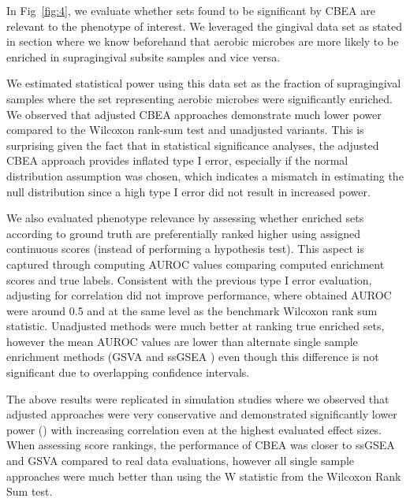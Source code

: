 \documentclass[10pt,letterpaper]{article}
\begin{document}
In Fig~\ref{fig:4}, we evaluate whether sets found to be significant by CBEA are relevant to the phenotype of interest. We leveraged the gingival data set as stated in  section where we know beforehand that aerobic microbes are more likely to be enriched in supragingival subsite samples and vice versa. 

We estimated statistical power using this data set as the fraction of supragingival samples where the set representing aerobic microbes were significantly enriched. We observed that adjusted CBEA approaches demonstrate much lower power compared to the Wilcoxon rank-sum test and unadjusted variants. This is surprising given the fact that in statistical significance analyses, the adjusted CBEA approach provides inflated type I error, especially if the normal distribution assumption was chosen, which indicates a mismatch in estimating the null distribution since a high type I error did not result in increased power. 

We also evaluated phenotype relevance by assessing whether enriched sets according to ground truth are preferentially ranked higher using assigned continuous scores (instead of performing a hypothesis test). This aspect is captured through computing AUROC values comparing computed enrichment scores and true labels. Consistent with the previous type I error evaluation, adjusting for correlation did not improve performance, where obtained AUROC were around 0.5 and at the same level as the benchmark Wilcoxon rank sum statistic. Unadjusted methods were much better at ranking true enriched sets, however the mean AUROC values are lower than alternate single sample enrichment methods (GSVA \cite{hanzelmann2013} and ssGSEA \cite{barbie2009}) even though this difference is not significant due to overlapping confidence intervals.  

The above results were replicated in simulation studies where we observed that adjusted approaches were very conservative and demonstrated significantly lower power () with increasing correlation even at the highest evaluated effect sizes. When assessing score rankings, the performance of CBEA was closer to ssGSEA and GSVA compared to real data evaluations, however all single sample approaches were much better than using the W statistic from the Wilcoxon Rank Sum test.   
\end{document}
